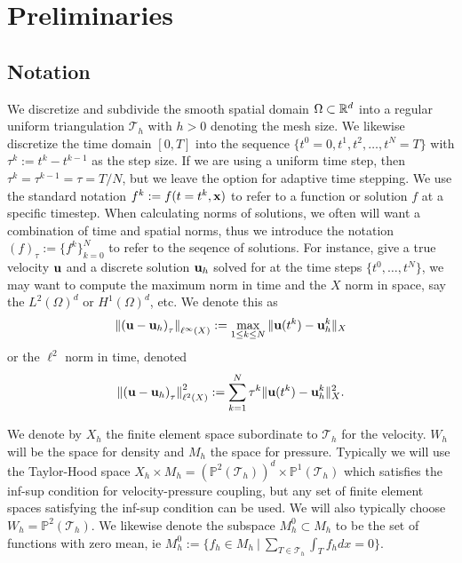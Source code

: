 \documentclass[letterpaper]{erdc}
\begin{document}
%
%
%
\section{Preliminaries}


%
%
\subsection{Notation}
We discretize and subdivide the smooth spatial domain $\Omega\subset \mathbb{R}^d$ into a regular uniform triangulation $\mathcal{T}_h$ with $h>0$ denoting the mesh size.  We likewise discretize the time domain $[0,T]$ into the sequence $\{ t^0=0, t^1, t^2, \dots, t^N = T\}$  with $\tau^k:= t^k-t^{k-1}$ as the step size.  If we are using a uniform time step, then $\tau^k = \tau^{k-1} = \tau = T/N$, but we leave the option for adaptive time stepping.  We use the standard notation $f^{k} := f(t=t^k,\textbf{x})$ to refer to a function or solution $f$ at a specific timestep.  When calculating norms of solutions, we often will want a combination of time and spatial norms,  thus we introduce the notation $\left( f \right)_{\tau}:= \{ f^k \}_{k=0}^{N}$ to refer to the seqence of solutions.  For instance, give a true velocity $\textbf{u}$ and a discrete solution $\textbf{u}_h$ solved for at the time steps $\{t^0,\dots, t^{N}\}$, we may want to compute the maximum norm in time and the $X$ norm in space, say the $L^2(\Omega)^d$ or $H^1(\Omega)^d$, etc.  We denote this as
\begin{equation}
  \left\| \left( \textbf{u} - \textbf{u}_h \right)_{\tau} \right\|_{\ell^{\infty}(X)} := \max_{1\leq k \leq N} \| \textbf{u}(t^{k}) - \textbf{u}_h^{k}\|_{X}
\end{equation}
or the $\ell^2$ norm in time, denoted
\begin{equation}
  \left\| \left( \textbf{u} - \textbf{u}_h \right)_{\tau} \right\|^2_{\ell^{2}(X)} :=  \sum_{k=1}^{N} \tau^{k}\| \textbf{u}(t^{k}) - \textbf{u}_h^{k}\|^2_{X}.
\end{equation}

We denote by $X_h$ the finite element space subordinate to $\mathcal{T}_h$ for the velocity.  $W_h$ will be the space for density and $M_h$ the space for pressure.  Typically we will use the Taylor-Hood space $X_h \times M_h = \left(\mathbb{P}^2\left(\mathcal{T}_h\right)\right)^d\times \mathbb{P}^1\left(\mathcal{T}_h\right)$ which satisfies the inf-sup condition for velocity-pressure coupling, but any set of finite element spaces satisfying the inf-sup condition can be used.  We will also typically choose $W_h = \mathbb{P}^2\left(\mathcal{T}_h\right)$.  We likewise denote the subspace $M_h^0\subset M_h$ to be the set of functions with zero mean, ie $M_h^0 := \{ f_h\in M_h \:|\: \sum_{T\in\mathcal{T}_h}\int_{T}f_h dx = 0\}$.
\end{document}

